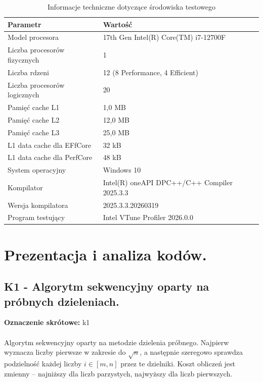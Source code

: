 \documentclass[10pt]{article}
\begin{document}
\begin{table}[h!]
\centering
\begin{tabular}{|l|l|}
\hline
\textbf{Parametr} & \textbf{Wartość} \\
\hline
Model procesora & 17th Gen Intel(R) Core(TM) i7-12700F \\
\hline
Liczba procesorów fizycznych & 1 \\
\hline
Liczba rdzeni & 12 (8 Performance, 4 Efficient)\\
\hline
Liczba procesorów logicznych & 20 \\
\hline
Pamięć cache L1 & 1,0 MB \\
\hline
Pamięć cache L2 & 12,0 MB \\
\hline
Pamięć cache L3 & 25,0 MB \\
\hline
L1 data cache dla EFfCore & 32 kB \\
\hline
L1 data cache dla PerfCore & 48 kB \\
\hline
System operacyjny & Windows 10 \\
\hline
Kompilator & Intel(R) oneAPI DPC++/C++ Compiler 2025.3.3 \\
\hline
Wersja kompilatora & 2025.3.3.20260319 \\
\hline
Program testujący & Intel VTune Profiler 2026.0.0\\
\hline
\end{tabular}
\caption{Informacje techniczne dotyczące środowiska testowego}
\end{table}


\newpage
\section{Prezentacja i analiza kodów.}

\subsection*{K1 - Algorytm sekwencyjny oparty na próbnych dzieleniach.}
\textbf{Oznaczenie skrótowe:} k1
\\ \\
Algorytm sekwencyjny oparty na metodzie dzielenia próbnego. Najpierw wyznacza liczby pierwsze w zakresie do $\sqrt{n}$, a następnie szeregowo sprawdza podzielność każdej liczby $i \in [m, n]$ przez te dzielniki. Koszt obliczeń jest zmienny – najniższy dla liczb parzystych, najwyższy dla liczb pierwszych.
\\
\end{document}
